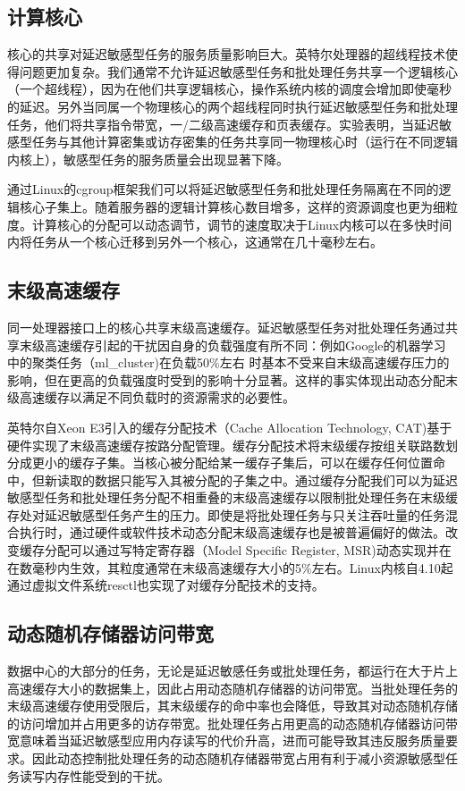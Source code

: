 \subsection{计算核心}
核心的共享对延迟敏感型任务的服务质量影响巨大\cite{lo2015heracles}。英特尔处理器的超线程技术使得问题更加复杂。我们通常不允许延迟敏感型任务和批处理任务共享一个逻辑核心（一个超线程），因为在他们共享逻辑核心，操作系统内核的调度会增加即使毫秒的延迟\cite{leverich2014reconciling}。另外当同属一个物理核心的两个超线程同时执行延迟敏感型任务和批处理任务，他们将共享指令带宽，一/二级高速缓存和页表缓存。实验表明，当延迟敏感型任务与其他计算密集或访存密集的任务共享同一物理核心时（运行在不同逻辑内核上），敏感型任务的服务质量会出现显著下降\cite{lo2015heracles}。

通过Linux的cgroup框架\cite{menage2008cgroups}我们可以将延迟敏感型任务和批处理任务隔离在不同的逻辑核心子集上。随着服务器的逻辑计算核心数目增多，这样的资源调度也更为细粒度。计算核心的分配可以动态调节，调节的速度取决于Linux内核可以在多快时间内将任务从一个核心迁移到另外一个核心，这通常在几十毫秒左右。

\subsection{末级高速缓存}
同一处理器接口上的核心共享末级高速缓存。延迟敏感型任务对批处理任务通过共享末级高速缓存引起的干扰因自身的负载强度有所不同：例如Google的机器学习中的聚类任务（ml\_cluster)在负载50\%左右
 时基本不受来自末级高速缓存压力的影响，但在更高的负载强度时受到的影响十分显著\cite{lo2015heracles}。这样的事实体现出动态分配末级高速缓存以满足不同负载时的资源需求的必要性。

英特尔自Xeon E3引入的缓存分配技术（Cache Allocation Technology, CAT)基于硬件实现了末级高速缓存按路分配管理\cite{guide2011intel}。缓存分配技术将末级缓存按组关联路数划分成更小的缓存子集。当核心被分配给某一缓存子集后，可以在缓存任何位置命中，但新读取的数据只能写入其被分配的子集之中。通过缓存分配我们可以为延迟敏感型任务和批处理任务分配不相重叠的末级高速缓存以限制批处理任务在末级缓存处对延迟敏感型任务产生的压力。即使是将批处理任务与只关注吞吐量的任务混合执行时，通过硬件或软件技术动态分配末级高速缓存也是被普遍偏好的做法\cite{cook2013hardware}\cite{iyer2007qos}\cite{qureshi2006utility}\cite{lin2008gaining}\cite{nathuji2010q}。改变缓存分配可以通过写特定寄存器（Model Specific Register, MSR)动态实现并在在数毫秒内生效，其粒度通常在末级高速缓存大小的5\%左右。Linux内核自4.10起通过虚拟文件系统resctl也实现了对缓存分配技术的支持。

\subsection{动态随机存储器访问带宽}
数据中心的大部分的任务，无论是延迟敏感任务或批处理任务，都运行在大于片上高速缓存大小的数据集上，因此占用动态随机存储器的访问带宽。当批处理任务的末级高速缓存使用受限后，其末级缓存的命中率也会降低，导致其对动态随机存储的访问增加并占用更多的访存带宽。批处理任务占用更高的动态随机存储器访问带宽意味着当延迟敏感型应用内存读写的代价升高，进而可能导致其违反服务质量要求。因此动态控制批处理任务的动态随机存储器带宽占用有利于减小资源敏感型任务读写内存性能受到的干扰。

